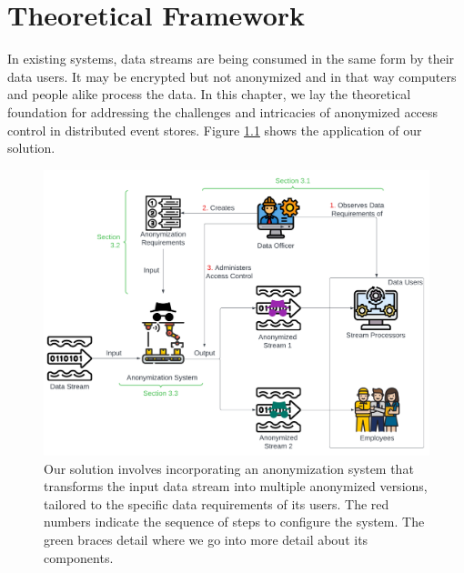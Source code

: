 \chapter{Theoretical Framework\label{cha:chapter3}}
In existing systems, data streams are being consumed in the same form by their data users. It may be encrypted but not anonymized and in that way computers and people alike process the data. In this chapter, we lay the theoretical foundation for addressing the challenges and intricacies of anonymized access control in distributed event stores. Figure \ref{fig:theoretical_framework} shows the application of our solution. 

\begin{figure}[ht]
    \begin{adjustbox}{center}
    \includegraphics[width=0.73\pdfpagewidth]{img/Theoretical_framework.pdf}
    \end{adjustbox}
    \caption[Big picture of our solution to anonymizing data streams for the different data needs of its users.] {Our solution involves incorporating an anonymization system that transforms the input data stream into multiple anonymized versions, tailored to the specific data requirements of its users. The red numbers indicate the sequence of steps to configure the system. The green braces detail where we go into more detail about its components. \label{fig:theoretical_framework}}
\end{figure}

